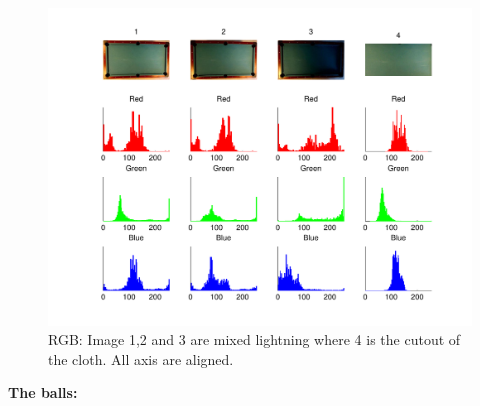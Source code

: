 \begin{figure}[H]
\begin{center}
\leavevmode
\includegraphics[width=1\textwidth]{images/rgb_hist_table}
\end{center}
\caption{RGB: Image 1,2 and 3 are mixed lightning where 4 is the cutout of the cloth. All axis are aligned.}
\label{fig:tablergb}
\end{figure}




\textbf{The balls:}\\